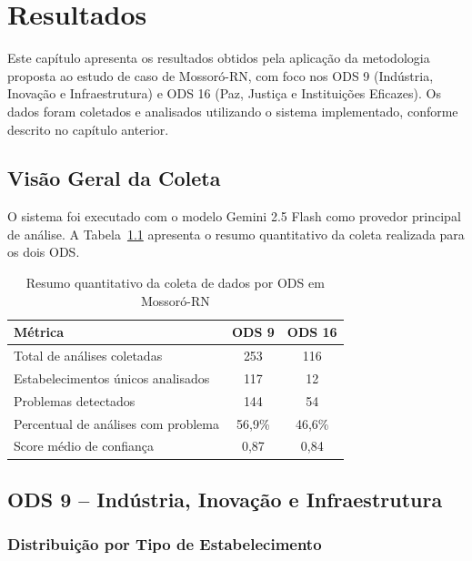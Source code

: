 \chapter{Resultados}
\label{cap:resultados}

Este capítulo apresenta os resultados obtidos pela aplicação da metodologia proposta ao estudo de caso de Mossoró-RN, com foco nos ODS 9 (Indústria, Inovação e Infraestrutura) e ODS 16 (Paz, Justiça e Instituições Eficazes). Os dados foram coletados e analisados utilizando o sistema implementado, conforme descrito no capítulo anterior.

\section{Visão Geral da Coleta}
\label{sec:coleta-geral}

O sistema foi executado com o modelo Gemini 2.5 Flash como provedor principal de análise. A Tabela~\ref{tab:resumo-coleta} apresenta o resumo quantitativo da coleta realizada para os dois ODS.

\begin{table}[h!]
    \centering
    \caption{Resumo quantitativo da coleta de dados por ODS em Mossoró-RN}
    \label{tab:resumo-coleta}
    \begin{tabular}{lcc}
        \hline
        \textbf{Métrica} & \textbf{ODS 9} & \textbf{ODS 16} \\
        \hline
        Total de análises coletadas & 253 & 116 \\
        Estabelecimentos únicos analisados & 117 & 12 \\
        Problemas detectados & 144 & 54 \\
        Percentual de análises com problema & 56,9\% & 46,6\% \\
        Score médio de confiança & 0,87 & 0,84 \\
        \hline
    \end{tabular}
\end{table}

\section{ODS 9 -- Indústria, Inovação e Infraestrutura}
\label{sec:resultados-ods9}

\subsection{Distribuição por Tipo de Estabelecimento}
\label{subsec:tipos-ods9}

